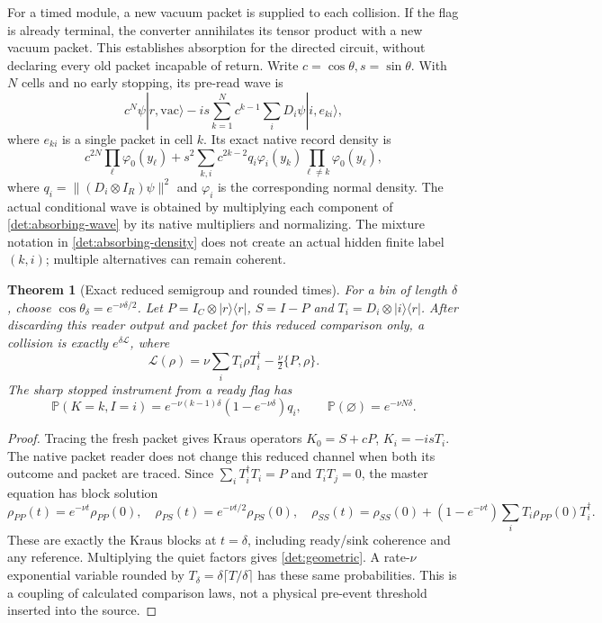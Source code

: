 \documentclass[11pt,oneside,openany]{book}
\newtheorem{theorem}{Theorem}[chapter]
\theoremstyle{definition}
\theoremstyle{remark}\newtheorem{remark}[theorem]{Remark}
\begin{document}
For a timed module, a new vacuum packet is supplied to each collision.
If the flag is already terminal, the converter annihilates its tensor
product with a new vacuum packet. This establishes absorption for the
directed circuit, without declaring every old packet incapable of
return. Write $c=\cos\theta,s=\sin\theta$. With $N$ cells and no
early stopping, its pre-read wave is
\begin{equation}
 c^N\psi|r,\mathrm{vac}\rangle
 -is\sum_{k=1}^Nc^{k-1}\sum_iD_i\psi|i,e_{ki}\rangle,        \label{det:absorbing-wave}
\end{equation}
where $e_{ki}$ is a single packet in cell $k$. Its exact native
record density is
\begin{equation}
 c^{2N}\prod_\ell\varphi_0(y_\ell)
 +s^2\sum_{k,i}c^{2k-2}q_i\varphi_i(y_k)
                       \prod_{\ell\ne k}\varphi_0(y_\ell),   \label{det:absorbing-density}
\end{equation}
where $q_i=\|(D_i\otimes I_R)\psi\|^2$ and $\varphi_i$ is the
corresponding normal density. The actual conditional wave is obtained
by multiplying each component of \eqref{det:absorbing-wave} by its
native multipliers and normalizing. The mixture notation in
\eqref{det:absorbing-density} does not create an actual hidden finite
label $(k,i)$; multiple alternatives can remain coherent.

\begin{theorem}[Exact reduced semigroup and rounded times]
\label{det:grid}
For a bin of length $\delta$, choose
$\cos\theta_\delta=e^{-\nu\delta/2}$. Let
$P=I_C\otimes|r\rangle\langle r|$, $S=I-P$ and
$T_i=D_i\otimes|i\rangle\langle r|$. After discarding this
reader output and packet for this reduced comparison only, a collision
is exactly $e^{\delta\mathcal L}$, where
\[
 \mathcal L(\rho)=\nu\sum_iT_i\rho T_i^\dagger
                         -\tfrac\nu2\{P,\rho\}.
\]
The sharp stopped instrument from a ready flag has
\begin{equation}
 \mathbb P(K=k,I=i)=e^{-\nu(k-1)\delta}
           (1-e^{-\nu\delta})q_i,
 \qquad \mathbb P(\varnothing)=e^{-\nu N\delta}.             \label{det:geometric}
\end{equation}
\end{theorem}
\begin{proof}
Tracing the fresh packet gives Kraus operators
$K_0=S+cP$, $K_i=-isT_i$. The native packet reader does not change
this reduced channel when both its outcome and packet are traced.
Since $\sum_iT_i^\dagger T_i=P$ and $T_iT_j=0$, the master equation
has block solution
\[
 \rho_{PP}(t)=e^{-\nu t}\rho_{PP}(0),\quad
 \rho_{PS}(t)=e^{-\nu t/2}\rho_{PS}(0),\quad
 \rho_{SS}(t)=\rho_{SS}(0)+(1-e^{-\nu t})
                    \sum_iT_i\rho_{PP}(0)T_i^\dagger.
\]
These are exactly the Kraus blocks at $t=\delta$, including ready/sink
coherence and any reference. Multiplying the quiet factors gives
\eqref{det:geometric}. A rate-$\nu$ exponential variable rounded by
$T_\delta=\delta\lceil T/\delta\rceil$ has these same probabilities.
This is a coupling of calculated comparison laws, not a physical
pre-event threshold inserted into the source.
\end{proof}
\end{document}
